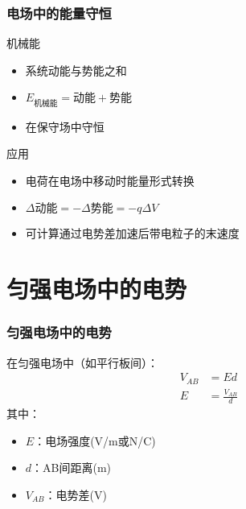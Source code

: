 \documentclass{beamer}
\begin{document}
\begin{frame}
    \frametitle{电场中的能量守恒}
    
    \begin{block}{机械能}
        \begin{itemize}
            \item 系统动能与势能之和
            \item $E_{机械能} = \text{动能} + \text{势能}$
            \item 在保守场中守恒
        \end{itemize}
    \end{block}
    
    \begin{block}{应用}
        \begin{itemize}
            \item 电荷在电场中移动时能量形式转换
            \item $\Delta \text{动能} = -\Delta \text{势能} = -q\Delta V$
            \item 可计算通过电势差加速后带电粒子的末速度
        \end{itemize}
    \end{block}
\end{frame}

\section{匀强电场中的电势}

\begin{frame}
    \frametitle{匀强电场中的电势}
    
    在匀强电场中（如平行板间）：
    \begin{align}
        V_{AB} &= Ed \\
        E &= \frac{V_{AB}}{d}
    \end{align}
    其中：
    \begin{itemize}
        \item $E$：电场强度(V/m或N/C)
        \item $d$：AB间距离(m)
        \item $V_{AB}$：电势差(V)
    \end{itemize}
\end{frame}
\end{document}

